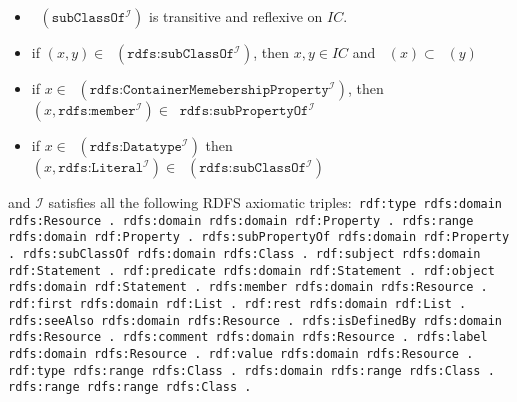 \documentclass{article}
\DeclareMathOperator{\IEXT}{I_{EXT}}
\DeclareMathOperator{\ICEXT}{I_{CEXT}}
\newcommand{\deno}[1]{{\texttt{#1}}^{\mathcal{I}}}
\begin{document}
\begin{defin}
\begin{itemize}
\item $\IEXT(\deno{subClassOf})$ is transitive and reflexive on $IC$.

\item if $(x,y) \in \IEXT(\deno{rdfs:subClassOf})$, then $x,y \in IC$ and $\ICEXT(x) \subset \ICEXT(y)$

\item if $x \in \ICEXT(\deno{rdfs:ContainerMemebershipProperty})$, then $(x,\deno{rdfs:member}) \in \IEXT{\deno{rdfs:subPropertyOf}}$

\item if $x \in \ICEXT(\deno{rdfs:Datatype})$ then $(x,\deno{rdfs:Literal}) \in \IEXT(\deno{rdfs:subClassOf})$ 

\end{itemize}
and $\mathcal{I}$ satisfies all the following RDFS axiomatic triples:\newline\texttt{
rdf:type rdfs:domain rdfs:Resource . \newline
rdfs:domain rdfs:domain rdf:Property . \newline
rdfs:range rdfs:domain rdf:Property . \newline
rdfs:subPropertyOf rdfs:domain rdf:Property . \newline
rdfs:subClassOf rdfs:domain rdfs:Class . \newline
rdf:subject rdfs:domain rdf:Statement . \newline
rdf:predicate rdfs:domain rdf:Statement . \newline
rdf:object rdfs:domain rdf:Statement . \newline
rdfs:member rdfs:domain rdfs:Resource . \newline
rdf:first rdfs:domain rdf:List . \newline
rdf:rest rdfs:domain rdf:List . \newline
rdfs:seeAlso rdfs:domain rdfs:Resource . \newline
rdfs:isDefinedBy rdfs:domain rdfs:Resource . \newline
rdfs:comment rdfs:domain rdfs:Resource . \newline
rdfs:label rdfs:domain rdfs:Resource . \newline
rdf:value rdfs:domain rdfs:Resource . \newline
\newline
rdf:type rdfs:range rdfs:Class . \newline
rdfs:domain rdfs:range rdfs:Class . \newline
rdfs:range rdfs:range rdfs:Class .\newline
}
\end{defin}
\end{document}
